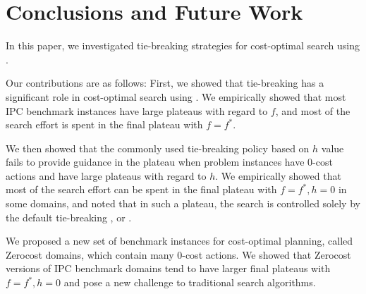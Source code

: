 
\section{Conclusions and Future Work}

In this paper, we investigated tie-breaking strategies for cost-optimal search using \astar.  
\begin{comment} %
We sought to (1) shed some light on the importance of tie-breaking in \astar,  %
(2) improve \astar without modifying its main heuristic function at all, and (3) to
improve \astar by introducing inadmissible techniques. We reached all of these goals successfully: We sought
various possible enhancements and achieved significant performance improvements solely by the tie-breaking
techniques. In detail, the contributions in this paper are the following:
\end{comment}
Our contributions are as follows:
 First, we showed that tie-breaking has a significant role in cost-optimal
       search using \astar. We empirically showed that most  IPC
       benchmark instances have large plateaus with regard to $f$, and most of the
       search effort is spent in the final plateau with $f=f^*$.

 We then showed that  the commonly used tie-breaking policy based on $h$ value fails to
       provide guidance in the plateau when problem instances have 0-cost
       actions and have large plateaus with regard to $h$.
       We empirically showed that most of the search effort can be spent in
       the final plateau with $f=f^*, h=0$ in some domains, and noted that in such
       a plateau, the search is controlled solely by the
       default tie-breaking \fifo, \lifo or \ro.

 We proposed  a new set of benchmark instances for cost-optimal planning, called Zerocost
 domains, which contain many 0-cost actions.
         We showed that Zerocost versions of IPC benchmark domains tend to have larger final plateaus with $f=f^*, h=0$ and pose a new challenge to traditional search algorithms.

